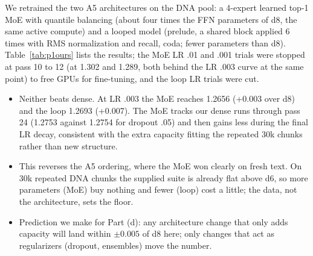  We retrained the two A5 architectures on the DNA pool: a 4-expert learned top-1 MoE with quantile balancing (about four times the FFN parameters of d8, the same active compute) and a looped model (prelude, a shared block applied 6 times with RMS normalization and recall, coda; fewer parameters than d8). Table~\ref{tab:p1ours} lists the results; the MoE LR .01 and .001 trials were stopped at pass 10 to 12 (at 1.302 and 1.289, both behind the LR .003 curve at the same point) to free GPUs for fine-tuning, and the loop LR trials were cut.
\begin{itemize}
\item Neither beats dense. At LR .003 the MoE reaches 1.2656 (+0.003 over d8) and the loop 1.2693 (+0.007). The MoE tracks our dense runs through pass 24 (1.2753 against 1.2754 for dropout .05) and then gains less during the final LR decay, consistent with the extra capacity fitting the repeated 30k chunks rather than new structure.
\item This reverses the A5 ordering, where the MoE won clearly on fresh text. On 30k repeated DNA chunks the supplied suite is already flat above d6, so more parameters (MoE) buy nothing and fewer (loop) cost a little; the data, not the architecture, sets the floor.
\item Prediction we make for Part (d): any architecture change that only adds capacity will land within $\pm0.005$ of d8 here; only changes that act as regularizers (dropout, ensembles) move the number.
\end{itemize}
